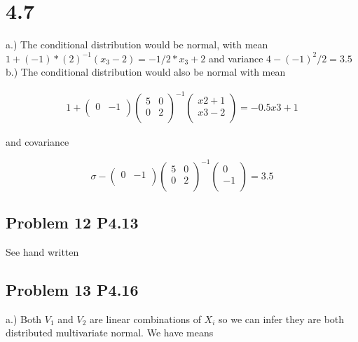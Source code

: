 \documentclass[
]{article}
\begin{document}
\hypertarget{section-1}{%
\section{4.7}\label{section-1}}

a.) The conditional distribution would be normal, with mean
\(1 + (-1) * (2)^{-1}(x_3 - 2) = -1/2*x_3 + 2\) and variance
\(4 − (−1)^2/2 = 3.5\) b.) The conditional distribution would also be
normal with mean

\begin{align*}
1 + \begin{pmatrix} 0 & −1 \\
\end{pmatrix}
\begin{pmatrix}
5 & 0 \\
0 & 2 \\ \end{pmatrix} ^{−1}
\begin{pmatrix}
x2 + 1 \\
x3 − 2 \\
\end{pmatrix}
= −0.5x3 + 1
\end{align*}

and covariance

\[
\sigma - \begin{pmatrix} 0 & −1 \\
\end{pmatrix}\begin{pmatrix}
5 & 0 \\
0 & 2 \\ \end{pmatrix} ^{−1} \begin{pmatrix}
0 \\
-1 \\
\end{pmatrix} = 3.5
\]

\hypertarget{problem-12-p4.13}{%
\subsection{Problem 12 P4.13}\label{problem-12-p4.13}}

See hand written

\hypertarget{problem-13-p4.16}{%
\subsection{Problem 13 P4.16}\label{problem-13-p4.16}}

a.) Both \(V_1\) and \(V_2\) are linear combinations of \(X_i\) so we
can infer they are both distributed multivariate normal. We have means
\end{document}
